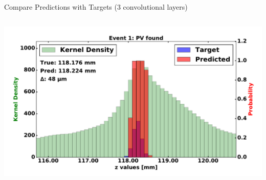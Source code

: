 \begin{frame}{Compare Predictions with Targets (3 convolutional layers)}
\begin{columns}[c]
\begin{center}
           \includegraphics[width=1\textwidth, height=0.45\textwidth, trim=18 0 18 0]{images/120000_3layer_07.pdf}
       \end{center}
  \end{columns}
\end{frame}


